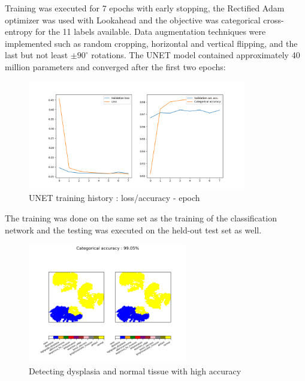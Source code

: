 \documentclass[a4paper,12pt]{article}
\begin{document}
\vspace{4mm}

\par Training was executed for 7 epochs with early stopping, the Rectified Adam optimizer was used with Lookahead and the objective was categorical cross-entropy for the 11 labels available. Data augmentation techniques were implemented such as random cropping, horizontal and vertical flipping, and the last but not least $\pm 90^{\circ}$ rotations. The UNET model contained approximately 40 million parameters and converged after the first two epochs:

\vspace{4mm}

\begin{figure}[H]
    \centering
    \includegraphics[width=0.85\textwidth]{results/unet_training_history.png}
    \caption{UNET training history : loss/accuracy - epoch}
    \label{fig:unet_training_history}
\end{figure}

\vspace{4mm}

\par The training was done on the same set as the training of the classification network and the testing was executed on the held-out test set as well.

\vspace{4mm}

\begin{figure}[H]
    \centering
    \includegraphics[width=0.62\textwidth]{results/009_19_5011_I.png}
    \caption{Detecting dysplasia and normal tissue with high accuracy}
    \label{fig:dysplasia_normal_unet}
\end{figure}
\end{document}
